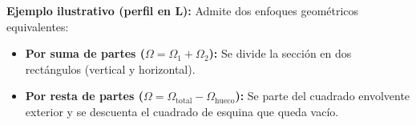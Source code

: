 \begin{ImportanteBox}
\begin{enumerate}
              \textbf{Ejemplo ilustrativo (perfil en L):} Admite dos enfoques geométricos equivalentes:

              \begin{itemize}

                  \item \textbf{Por suma de partes ($\Omega = \Omega_1 + \Omega_2$):} Se divide la sección en dos rectángulos (vertical y horizontal).

                  \item \textbf{Por resta de partes ($\Omega = \Omega_{\text{total}} - \Omega_{\text{hueco}}$):} Se parte del cuadrado envolvente exterior y se descuenta el cuadrado de esquina que queda vacío.

              \end{itemize}



              \begin{center}

\end{center}
\end{enumerate}
\end{ImportanteBox}
